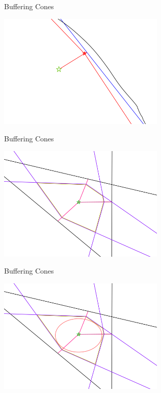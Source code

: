 \documentclass{beamer}
\begin{document}
\begin{frame}{Buffering Cones}
	\begin{center}
		\includegraphics[width=300px]{images/explanation_3.png}
	\end{center}
\end{frame}


\begin{frame}{Buffering Cones}
	\begin{center}
		\includegraphics[width=300px]{images/completed_1.png}
	\end{center}
\end{frame}


\begin{frame}{Buffering Cones}
	\begin{center}
		\includegraphics[width=300px]{images/completed_2.png}
	\end{center}
\end{frame}
\end{document}
